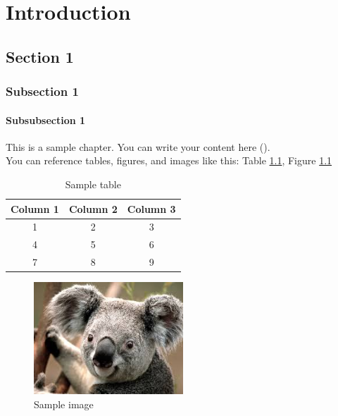 \chapter{Introduction}

\section{Section 1}

\subsection{Subsection 1}

\subsubsection{Subsubsection 1}

This is a sample chapter. You can write your content here (\citealt{Nobody06}).\\

You can reference tables, figures, and images like this: Table \ref{tab:sample_table}, 
Figure \ref{fig:sample_image}\\

\begin{table}[H]
    \centering
    \begin{tabular}{*{3}{c}}
    \toprule
    \textbf{Column 1} & \textbf{Column 2} & \textbf{Column 3} \\
    \midrule
    1 & 2 & 3 \\
    4 & 5 & 6 \\
    7 & 8 & 9 \\
    \bottomrule
    \end{tabular}
    \caption{Sample table}
    \label{tab:sample_table}
\end{table}

\begin{figure}[H]
    \centering
    \includegraphics[width=0.5\textwidth]{chapters/chapter_1/assets/image.jpg}
    \caption{Sample image}
    \label{fig:sample_image}
\end{figure}
